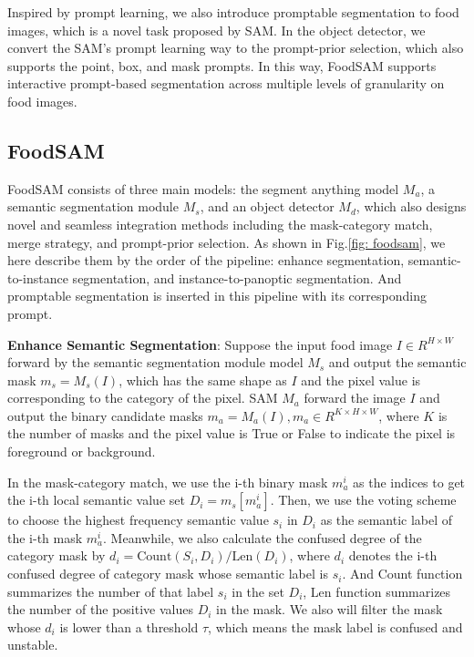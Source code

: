 \documentclass[lettersize,journal]{IEEEtran}
\begin{document}
Inspired by prompt learning, we also introduce promptable segmentation to food images, which is a novel task proposed by SAM. 
In the object detector, we convert the SAM's prompt learning way to the prompt-prior selection, which also supports the point, box, and mask prompts. 
In this way, FoodSAM supports interactive prompt-based segmentation across multiple levels of granularity on food images.



\subsection{FoodSAM}
FoodSAM consists of three main models: the segment anything model $M_a$, a semantic segmentation module $M_s$, and an object detector $M_d$, 
which also designs novel and seamless integration methods including the mask-category match, merge strategy, and prompt-prior selection. 
As shown in Fig.\ref{fig: foodsam}, we here describe them by the order of the pipeline: enhance segmentation, semantic-to-instance segmentation, and 
instance-to-panoptic segmentation. 
And promptable segmentation is inserted in this pipeline with its corresponding prompt.

\textbf{Enhance Semantic Segmentation}: Suppose the input food image $I\in R^{H\times W}$ forward by the semantic segmentation module model $M_s$ and output the semantic mask $m_s = M_s(I)$, 
which has the same shape as $I$ and the pixel value is corresponding to the category of the pixel.
SAM $M_a$ forward the image $I$ and output the binary candidate masks $m_a = M_a(I), m_a\in R^{K\times H \times W}$, where $K$ is the number of masks and the pixel value is True or False to indicate the pixel is foreground or background.

In the mask-category match, we use the i-th binary mask $m_a^i$ as the indices to get the i-th local semantic value set $ D_i =  m_s[m_a^i]$. 
Then, we use the voting scheme to choose the highest frequency semantic value $s_i$ in $D_i$ as the semantic label of the i-th mask $m_a^i$.
Meanwhile, we also calculate the confused degree of the category mask by
$d_i = \text{Count}(S_i, D_i) / \text{Len}(D_i)$, where $d_i$ denotes the i-th confused degree of category mask whose semantic label is $s_i$. 
And Count function summarizes the number of that label $s_i$ in the set $D_i$, Len function summarizes the number of the positive values $D_i$
 in the mask.  We also will filter the mask whose $d_i$ is lower than a threshold $\tau$, which means the mask label is confused and unstable.
 
\end{document}
